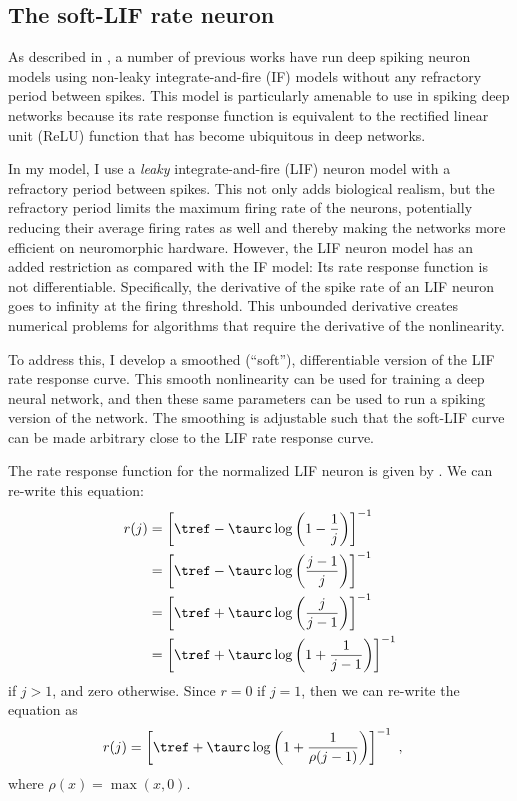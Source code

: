 \subsection{The soft-LIF rate neuron}

As described in ,
a number of previous works have run deep spiking neuron models
using non-leaky integrate-and-fire (IF) models
without any refractory period between spikes.
This model is particularly amenable to use in spiking deep networks
because its rate response function
is equivalent to the rectified linear unit (ReLU) function
that has become ubiquitous in deep networks.

In my model, I use a \emph{leaky} integrate-and-fire (LIF) neuron model
with a refractory period between spikes.
This not only adds biological realism,
but the refractory period limits the maximum firing rate of the neurons,
potentially reducing their average firing rates as well
and thereby making the networks more efficient on neuromorphic hardware.
However, the LIF neuron model has an added restriction
as compared with the IF model:
Its rate response function is not differentiable.
Specifically, the derivative of the spike rate of an LIF neuron
goes to infinity at the firing threshold.
This unbounded derivative creates numerical problems
for algorithms that require the derivative of the nonlinearity.

To address this, I develop a smoothed (``soft''),
differentiable version of the LIF rate response curve.
This smooth nonlinearity can be used for training a deep neural network,
and then these same parameters can be used to run a spiking version of the network.
The smoothing is adjustable such that the soft-LIF curve can be made
arbitrary close to the LIF rate response curve.

The rate response function for the normalized LIF neuron
is given by .
We can re-write this equation:
\begin{align}
  r(j) &= \left[\tref - \taurc \log\left(1 - \frac{1}{j}\right)\right]^{-1} \nonumber\\
       &= \left[\tref - \taurc \log\left(\frac{j - 1}{j}\right)\right]^{-1} \nonumber\\
       &= \left[\tref + \taurc \log\left(\frac{j}{j - 1}\right)\right]^{-1} \nonumber\\
       &= \left[\tref + \taurc \log\left(1 + \frac{1}{j - 1}\right)\right]^{-1} \nonumber
\end{align}
if $j > 1$, and zero otherwise.
Since $r = 0$ if $j = 1$, then we can re-write the equation as
\begin{align}
  r(j) &= \left[\tref + \taurc \log\left(1 + \frac{1}{\rho(j - 1)}\right)\right]^{-1} \text{ ,}
  \eqnlabel{lifraterho}
\end{align}
where $\rho(x) = \max(x, 0)$.

